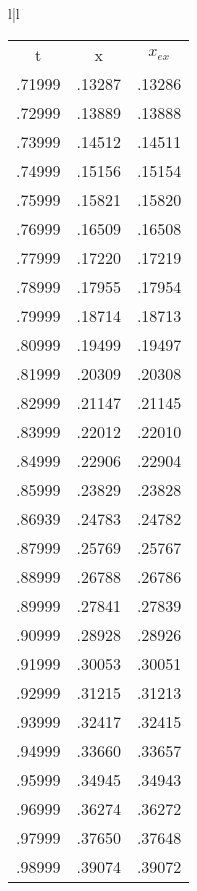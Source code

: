 \begin{figure}
    \centering
    \begin{tabular}{l|l}
        \begin{tabular}{ccc}
            \multicolumn{1}{c}{t} &  \multicolumn{1}{c}{x}  & \multicolumn{1}{c}{$x_{ex}$}\\
            .71999 & .13287 & .13286 \\  
            .72999 & .13889 & .13888 \\  
            .73999 & .14512 & .14511 \\  
            .74999 & .15156 & .15154 \\  
            .75999 & .15821 & .15820 \\  
            .76999 & .16509 & .16508 \\  
            .77999 & .17220 & .17219 \\  
            .78999 & .17955 & .17954 \\  
            .79999 & .18714 & .18713 \\  
            .80999 & .19499 & .19497 \\  
            .81999 & .20309 & .20308 \\  
            .82999 & .21147 & .21145 \\  
            .83999 & .22012 & .22010 \\  
            .84999 & .22906 & .22904 \\  
            .85999 & .23829 & .23828 \\  
            .86939 & .24783 & .24782 \\  
            .87999 & .25769 & .25767 \\  
            .88999 & .26788 & .26786 \\  
            .89999 & .27841 & .27839 \\  
            .90999 & .28928 & .28926 \\  
            .91999 & .30053 & .30051 \\  
            .92999 & .31215 & .31213 \\  
            .93999 & .32417 & .32415 \\  
            .94999 & .33660 & .33657 \\  
            .95999 & .34945 & .34943 \\  
            .96999 & .36274 & .36272 \\  
            .97999 & .37650 & .37648 \\  
            .98999 & .39074 & .39072 \\  

\end{tabular}
\end{tabular}
\end{figure}
